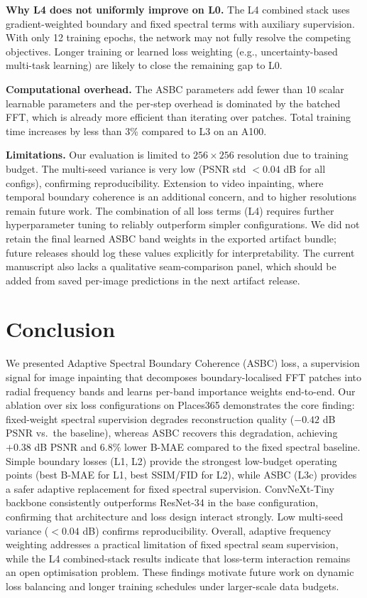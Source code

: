 \documentclass[10pt,conference]{IEEEtran}
\begin{document}
\textbf{Why L4 does not uniformly improve on L0.}
The L4 combined stack uses gradient-weighted boundary and fixed spectral terms
with auxiliary supervision. With only 12
training epochs, the network may not fully resolve the competing objectives.
Longer training or learned loss weighting (e.g., uncertainty-based
multi-task learning) are likely to close the remaining gap to L0.

\textbf{Computational overhead.}
The ASBC parameters add fewer than 10 scalar learnable parameters and the
per-step overhead is dominated by the batched FFT, which is already more
efficient than iterating over patches.  Total training time increases by
less than 3\% compared to L3 on an A100.

\textbf{Limitations.}
Our evaluation is limited to $256{\times}256$ resolution due to training budget.
The multi-seed variance is very low (PSNR std $< 0.04$ dB for all configs),
confirming reproducibility.  Extension to video inpainting, where temporal
boundary coherence is an additional concern, and to higher resolutions remain
future work.  The combination of all loss terms (L4) requires further
hyperparameter tuning to reliably outperform simpler configurations.
We did not retain the final learned ASBC band weights in the exported artifact
bundle; future releases should log these values explicitly for interpretability.
The current manuscript also lacks a qualitative seam-comparison panel, which
should be added from saved per-image predictions in the next artifact release.

\section{Conclusion}
\label{sec:conclusion}

We presented Adaptive Spectral Boundary Coherence (ASBC) loss, a
supervision signal for image inpainting that decomposes boundary-localised
FFT patches into radial frequency bands and learns per-band importance weights
end-to-end.  Our ablation over six loss configurations on Places365 demonstrates
the core finding: fixed-weight spectral supervision degrades reconstruction
quality ($-0.42$ dB PSNR vs.\ the baseline), whereas ASBC recovers this
degradation, achieving $+0.38$ dB PSNR and $6.8\%$ lower B-MAE compared to
the fixed spectral baseline.  Simple boundary losses (L1, L2) provide the
strongest low-budget operating points (best B-MAE for L1, best SSIM/FID for L2),
while ASBC (L3c) provides a safer adaptive replacement for fixed spectral supervision.
ConvNeXt-Tiny backbone
consistently outperforms ResNet-34 in the base configuration, confirming
that architecture and loss design interact strongly.
Low multi-seed variance ($<0.04$ dB) confirms reproducibility.
Overall, adaptive frequency weighting addresses a practical limitation of fixed
spectral seam supervision, while the L4 combined-stack results indicate that
loss-term interaction remains an open optimisation problem.
These findings motivate future work on dynamic loss balancing and longer
training schedules under larger-scale data budgets.



\end{document}
